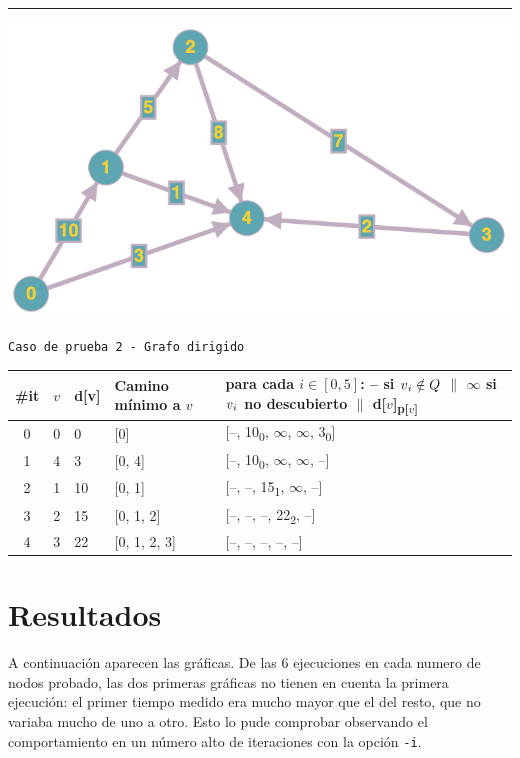 \documentclass[12pt , a4paper]{article}
\begin{document}
\begin{center}
	
	\vspace*{0.03\vsize}
	\par\noindent\rule{\textwidth}{1pt}

	
	\includegraphics[width=0.5\hsize]{prueba2.png}
	
	\texttt{Caso de prueba 2 - Grafo dirigido}
	\newline
	
	\begin{tabular}{c|*{3}{l|}l}
		
		\#it	& $v$ & d[v] & Camino mínimo a $v$ & \thead[l]{para cada $i \in [0,5]$:\\
		-- si $v\textsubscript{$i$} \notin Q$ $\|$ $\infty$ si $v\textsubscript{$i$}$ no descubierto $\|$ d[$v$]\textsubscript{p[$v$]}}\\
		\hline
		0 		& 0 & 0    & [0]           & [--, 10\textsubscript{0}, $\infty$, $\infty$, 3\textsubscript{0}]\\[0.07cm]
		1 		& 4 & 3    & [0, 4]        & [--, 10\textsubscript{0}, $\infty$, $\infty$, --]\\[0.07cm]
		2 		& 1 & 10   & [0, 1]        & [--, --, 15\textsubscript{1}, $\infty$, --]\\[0.07cm]
		3 		& 2 & 15   & [0, 1, 2]     & [--, --, --, 22\textsubscript{2}, --]\\[0.07cm]
		4 		& 3 & 22   & [0, 1, 2, 3]     & [--, --, --, --, --]\\[0.07cm]

	\end{tabular}
	
\end{center}	
\newpage
\section{Resultados}

	A continuación aparecen las gráficas. De las 6 ejecuciones en cada numero de nodos probado, las dos primeras gráficas no tienen en cuenta la primera ejecución: el primer tiempo medido era mucho mayor que el del resto, que no variaba mucho de uno a otro. Esto lo pude comprobar observando el comportamiento en un número alto de iteraciones con la opción \texttt{-i}.
	
\end{document}
